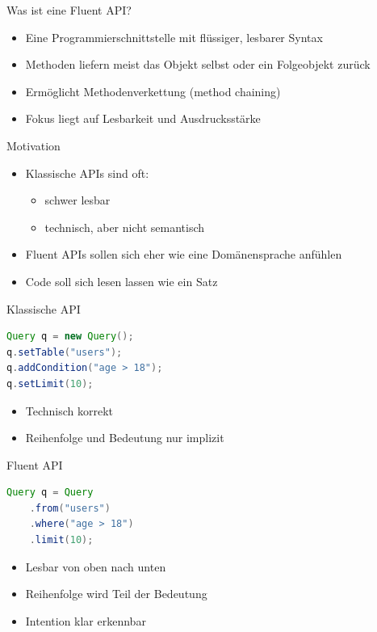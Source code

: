 \begin{frame}{Was ist eine Fluent API?}
	\begin{itemize}
		\item Eine Programmierschnittstelle mit flüssiger, lesbarer Syntax
		\item Methoden liefern meist das Objekt selbst oder ein Folgeobjekt zurück
		\item Ermöglicht Methodenverkettung (method chaining)
		\item Fokus liegt auf Lesbarkeit und Ausdrucksstärke
	\end{itemize}
\end{frame}

\begin{frame}{Motivation}
	\begin{itemize}
		\item Klassische APIs sind oft:
		\begin{itemize}
			\item schwer lesbar
			\item technisch, aber nicht semantisch
		\end{itemize}
		\item Fluent APIs sollen sich eher wie eine Domänensprache anfühlen
		\item Code soll sich lesen lassen wie ein Satz
	\end{itemize}
\end{frame}

\begin{frame}[fragile]{Klassische API}
	\begin{lstlisting}[language=Java]
Query q = new Query();
q.setTable("users");
q.addCondition("age > 18");
q.setLimit(10);
	\end{lstlisting}
	
	\pause
	\begin{itemize}
		\item Technisch korrekt
		\item Reihenfolge und Bedeutung nur implizit
	\end{itemize}
\end{frame}

\begin{frame}[fragile]{Fluent API}
	\begin{lstlisting}[language=Java]
Query q = Query
	.from("users")
	.where("age > 18")
	.limit(10);
	\end{lstlisting}
	
	\pause
	\begin{itemize}
		\item Lesbar von oben nach unten
		\item Reihenfolge wird Teil der Bedeutung
		\item Intention klar erkennbar
	\end{itemize}
\end{frame}


